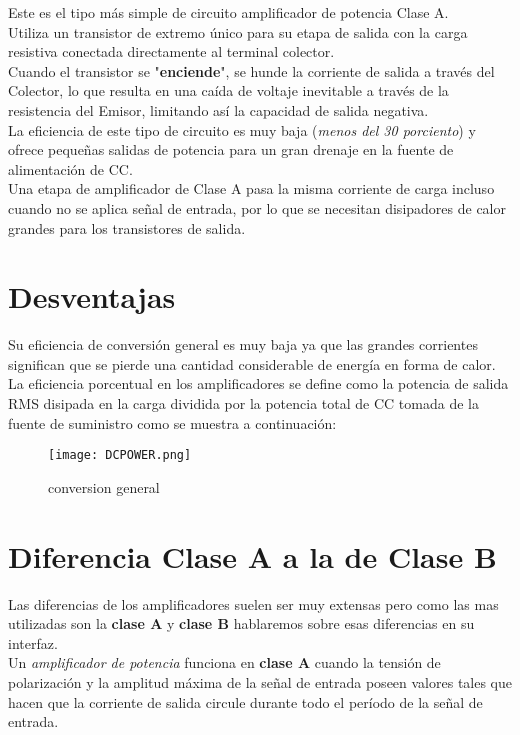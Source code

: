 \documentclass[11pt,a4paper]{article}
\begin{document}
Este es el tipo más simple de circuito amplificador de potencia Clase A.\\
Utiliza un transistor de extremo único para su etapa de salida con la carga resistiva conectada directamente al terminal colector.\\
Cuando el transistor se "\textbf{enciende}", se hunde la corriente de salida a través del Colector, lo que resulta en una caída de voltaje inevitable a través de la resistencia del Emisor, limitando así la capacidad de salida negativa.\\
La eficiencia de este tipo de circuito es muy baja (\emph{menos del 30 porciento}) y ofrece pequeñas salidas de potencia para un gran drenaje en la fuente de alimentación de CC.\\
Una etapa de amplificador de Clase A pasa la misma corriente de carga incluso cuando no se aplica señal de entrada, por lo que se necesitan disipadores de calor grandes para los transistores de salida.

\section{Desventajas}

Su eficiencia de conversión general es muy baja ya que las grandes corrientes significan que se pierde una cantidad considerable de energía en forma de calor.\\
La eficiencia porcentual en los amplificadores se define como la potencia de salida RMS disipada en la carga dividida por la potencia total de CC tomada de la fuente de suministro como se muestra a continuación:

\begin{figure}[h]
\centering
\texttt{[image: DCPOWER.png]} 
\caption{conversion general}
\end{figure}

\section{Diferencia Clase A a la de Clase B}

Las diferencias de los amplificadores suelen ser muy extensas pero como las mas utilizadas son la \textbf{clase A} y \textbf{clase B} hablaremos sobre esas diferencias en su interfaz.\\
Un \emph{amplificador de potencia} funciona en \textbf{clase A} cuando la tensión de polarización y la amplitud máxima de la señal de entrada poseen valores tales que hacen que la corriente de salida circule durante todo el período de la señal de entrada.\\
\end{document}
